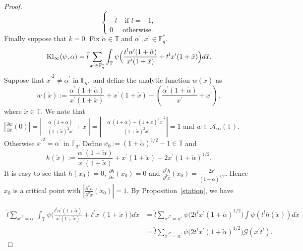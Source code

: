 \documentclass[10pt]{amsart}
\theoremstyle{plain}
\theoremstyle{plain}
\theoremstyle{remark}
\theoremstyle{definition}
\newcommand{\hl}{\widehat l}
\newcommand{\Kl}{\textup{Kl}}
\newcommand{\FF}{\mathbb{F}}
\newcommand{\TT}{\mathbb{T}}
\newcommand{\cA}{\mathcal{A}}
\newcommand{\cG}{\mathcal{G}}
\begin{document}
\begin{proof}
\[\begin{cases}
\\
-\hl &\text{ if } l=-1,
\\
0   &\text{otherwise.} \end{cases}
\]
Finally suppose that $k=0.$ Fix $\tilde{\alpha}\in \TT $ and $\alpha^{\prime}, x^{\prime} \in \FF_q^*.$
\[
\Kl_{\infty}(\psi,\alpha) =\hl \sum_{x^{\prime}\in \FF_q^{*}} \int_{\TT} \psi\Big(\frac{ t^{l}\alpha^{\prime} (1+\tilde{\alpha})}{x^{\prime}(1+\tilde{x})} + t^lx^{\prime}(1+\tilde{x}) \Big) d\tilde{x}.
\]
 Suppose that ${x^{\prime}}^2\neq \alpha^{\prime}$ in $\FF_q,$  and  define the analytic function $w(\tilde{x})$ as 
\[
w(\tilde{x}):=\frac{ \alpha^{\prime} (1+\tilde{\alpha})}{x^{\prime}(1+\tilde{x})} + x^{\prime}(1+\tilde{x})- \left(   \frac{ \alpha^{\prime} (1+\tilde{\alpha})}{x^{\prime}} +x^{\prime} \right), 
\]
where $\tilde{x}\in\TT.$ We note that 
$|\frac{\partial w}{\partial \tilde{x}}(0)|=|-\frac{ \alpha^{\prime} (1+\tilde{\alpha})}{(1+\tilde{x})^2x^{\prime}} + x^{\prime}|=|-\frac{ \alpha^{\prime} (1+\tilde{\alpha})-{(1+\tilde{x})^2x^{\prime}}^2}{(1+\tilde{x})^2x^{\prime}} |=1$ and    $w\in \cA_{\infty}(\TT).$ Otherwise ${x^{\prime}}^2= \alpha^{\prime}$ in $\FF_q$. Define $x_0:=(1+\tilde{\alpha})^{1/2}-1\in\TT$ and 
\[
h(\tilde{x}):=\frac{ \alpha^{\prime} (1+\tilde{\alpha})}{x^{\prime}(1+\tilde{x})} + x^{\prime}(1+\tilde{x})- 2x^{\prime}(1+\tilde{\alpha})^{1/2} .
\]
It is easy to see that $h(x_0)=0$, $\frac{\partial{h}}{\partial \tilde{x}}(x_0)=0$ and $\frac{\partial^2{h}}{\partial^2 \tilde{x}}(x_0)=\frac{2x^{\prime}}{(1+\tilde{\alpha})^{1/2}}$. Hence $x_0$ is a critical point with $|\frac{\partial^2{h}}{\partial^2 \tilde{x}}(x_0)|=1.$ By Proposition~\ref{station}, we have 

\begin{align*}
\hl \sum_{x'^2=\alpha ' } \int_{\TT} \psi\Big(\frac{ t^{l}\alpha^{\prime} (1+\tilde{\alpha})}{x^{\prime}(1+\tilde{x})} + t^lx^{\prime}(1+\tilde{x}) \Big) d\tilde{x}&=\hl \sum_{x'^2=\alpha ' }  \psi\Big(2t^{l}x^{\prime}(1+\tilde{\alpha})^{1/2} \Big) \int \psi(t^lh(\tilde{x})) d\tilde{x}
\\&= \hl\sum_{{x^{\prime}}^2= \alpha^{\prime}}  \psi\Big(2t^{l}x^{\prime}(1+\tilde{\alpha})^{1/2} \Big) \cG(x^{\prime}t^l).
\end{align*}


\end{proof}
\end{document}
